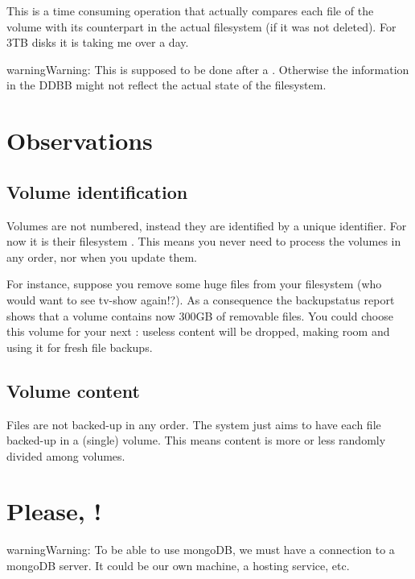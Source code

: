 \documentclass[letterpaper,10pt,english]{sphinxmanual}
\begin{document}
This is a time consuming operation that actually compares each file of the volume with its counterpart in the actual filesystem
(if it was not deleted). For 3TB disks it is taking me over a day.

\begin{sphinxadmonition}{warning}{Warning:}
This is supposed to be done after a . Otherwise the information in the DDBB might not reflect the actual state of the filesystem.
\end{sphinxadmonition}


\chapter{Observations}
\label{\detokenize{index:observations}}

\section{Volume identification}
\label{\detokenize{index:volume-identification}}
Volumes are not numbered, instead they are identified by a unique identifier. For now it is their filesystem .
This means you never need to process the volumes in any order, nor when you update them.

For instance, suppose you remove some huge files from your filesystem (who would want to see  tv-show again!?). As a consequence the backupstatus report
shows that a volume contains now 300GB of removable files. You could choose this volume for your next : useless content will be dropped, making room and using it for fresh file backups.


\section{Volume content}
\label{\detokenize{index:id5}}
Files are not backed-up in any order. The system just aims to have each file backed-up in a (single) volume. This means content is more or less randomly
divided among volumes.


\chapter{Please, !}
\label{\detokenize{index:please-be-aware}}
\begin{sphinxadmonition}{warning}{Warning:}
To be able to use mongoDB, we must have a connection to a mongoDB server. It could be our own machine, a hosting service, etc.
\end{sphinxadmonition}
\end{document}
